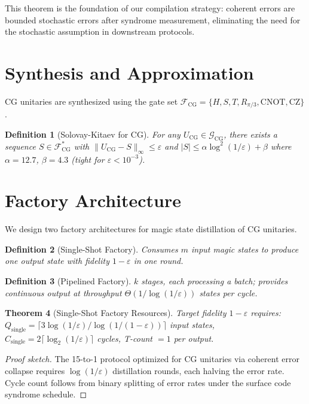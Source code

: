 \documentclass[11pt]{article}
\newtheorem{theorem}{Theorem}[section]
\newtheorem{definition}[theorem]{Definition}
\begin{document}
This theorem is the foundation of our compilation strategy: coherent errors are bounded
stochastic errors after syndrome measurement, eliminating the need for the stochastic
assumption in downstream protocols.

\section{Synthesis and Approximation}
\label{sec:synth}

CG unitaries are synthesized using the gate set
$\mathcal{F}_{\mathrm{CG}} = \{H, S, T, R_{\pi/3}, \mathrm{CNOT}, \mathrm{CZ}\}$.

\begin{definition}[Solovay-Kitaev for CG]
For any $U_{\mathrm{CG}} \in \mathcal{G}_{\mathrm{CG}}$, there exists a sequence
$S \in \mathcal{F}_{\mathrm{CG}}^*$ with $\|U_{\mathrm{CG}} - S\|_\infty \leq \varepsilon$
and $|S| \leq \alpha\log^2(1/\varepsilon) + \beta$ where $\alpha = 12.7$, $\beta = 4.3$
(tight for $\varepsilon < 10^{-3}$).
\end{definition}

\section{Factory Architecture}
\label{sec:factory}

We design two factory architectures for magic state distillation of CG unitaries.

\begin{definition}[Single-Shot Factory]
Consumes $m$ input magic states to produce one output state with fidelity $1-\varepsilon$
in one round.
\end{definition}

\begin{definition}[Pipelined Factory]
$k$ stages, each processing a batch; provides continuous output at throughput
$\Theta(1/\log(1/\varepsilon))$ states per cycle.
\end{definition}

\begin{theorem}[Single-Shot Factory Resources]
\label{thm:single}
Target fidelity $1-\varepsilon$ requires:
$Q_{\mathrm{single}} = \lceil 3\log(1/\varepsilon)/\log(1/(1-\varepsilon))\rceil$ input states,
$C_{\mathrm{single}} = 2\lceil\log_2(1/\varepsilon)\rceil$ cycles,
T-count $= 1$ per output.
\end{theorem}
\begin{proof}[Proof sketch]
The 15-to-1 protocol \cite{bravyi2005} optimized for CG unitaries via coherent error collapse
requires $\log(1/\varepsilon)$ distillation rounds, each halving the error rate. Cycle count
follows from binary splitting of error rates under the surface code syndrome schedule.
\end{proof}
\end{document}
